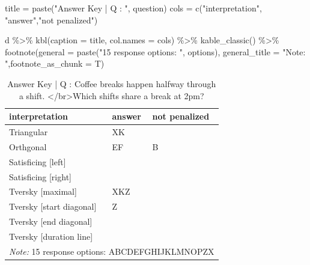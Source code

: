 \documentclass[
  letterpaper,
  DIV=11,
  numbers=noendperiod]{scrreprt}
\newenvironment{Shaded}{\begin{snugshade}}{\end{snugshade}}
\newcommand{\AttributeTok}[1]{\textcolor[rgb]{0.40,0.45,0.13}{#1}}
\newcommand{\FunctionTok}[1]{\textcolor[rgb]{0.28,0.35,0.67}{#1}}
\newcommand{\NormalTok}[1]{\textcolor[rgb]{0.00,0.23,0.31}{#1}}
\newcommand{\OtherTok}[1]{\textcolor[rgb]{0.00,0.23,0.31}{#1}}
\newcommand{\SpecialCharTok}[1]{\textcolor[rgb]{0.37,0.37,0.37}{#1}}
\newcommand{\StringTok}[1]{\textcolor[rgb]{0.13,0.47,0.30}{#1}}
\begin{document}
\begin{Shaded}
\begin{Highlighting}[]
\NormalTok{title }\OtherTok{=} \FunctionTok{paste}\NormalTok{(}\StringTok{"Answer Key | Q : "}\NormalTok{, question)}
\NormalTok{cols }\OtherTok{=} \FunctionTok{c}\NormalTok{(}\StringTok{"interpretation"}\NormalTok{, }\StringTok{"answer"}\NormalTok{,}\StringTok{"not penalized"}\NormalTok{)}

\NormalTok{d }\SpecialCharTok{\%\textgreater{}\%} \FunctionTok{kbl}\NormalTok{(}\AttributeTok{caption =}\NormalTok{ title, }\AttributeTok{col.names =}\NormalTok{ cols) }\SpecialCharTok{\%\textgreater{}\%} \FunctionTok{kable\_classic}\NormalTok{() }\SpecialCharTok{\%\textgreater{}\%}
  \FunctionTok{footnote}\NormalTok{(}\AttributeTok{general =} \FunctionTok{paste}\NormalTok{(}\StringTok{"15 response options: "}\NormalTok{, options), }\AttributeTok{general\_title =} \StringTok{"Note: "}\NormalTok{,}\AttributeTok{footnote\_as\_chunk =}\NormalTok{ T)}
\end{Highlighting}
\end{Shaded}

\begin{table}

\caption{Answer Key | Q :  Coffee breaks happen halfway through a shift. </br>Which shifts share a break at 2pm?}
\centering
\begin{tabular}[t]{l|l|l}
\hline
interpretation & answer & not penalized\\
\hline
Triangular & XK & \\
\hline
Orthgonal & EF & B\\
\hline
Satisficing [left] &  & \\
\hline
Satisficing [right] &  & \\
\hline
Tversky [maximal] & XKZ & \\
\hline
Tversky [start diagonal] & Z & \\
\hline
Tversky [end diagonal] &  & \\
\hline
Tversky [duration line] &  & \\
\hline
\multicolumn{3}{l}{\rule{0pt}{1em}\textit{Note: } 15 response options:  ABCDEFGHIJKLMNOPZX}\\
\end{tabular}
\end{table}
\end{document}
